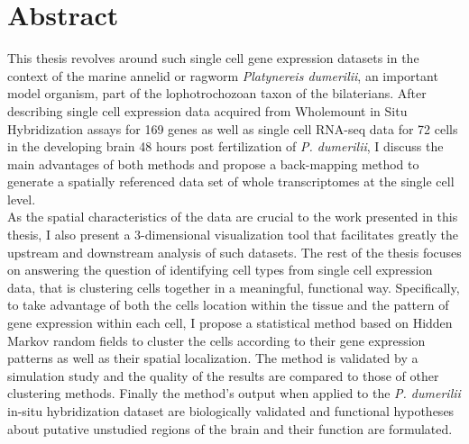 \begingroup
\let\clearpage\relax
\let\cleardoublepage\relax
\let\cleardoublepage\relax

\chapter*{Abstract}

This thesis revolves around such single cell gene expression datasets in the context of the marine annelid or ragworm \emph{Platynereis dumerilii}, an important model organism, part of the lophotrochozoan taxon of the bilaterians. After describing single cell expression data acquired from Wholemount in Situ Hybridization assays for 169 genes as well as single cell RNA-seq data for 72 cells in the developing brain 48 hours post fertilization of \emph{P. dumerilii}, I discuss the main advantages of both methods and propose a back-mapping method to generate a spatially referenced data set of whole transcriptomes at the single cell level.\\

As the spatial characteristics of the data are crucial to the work presented in this thesis, I also present a 3-dimensional visualization tool that facilitates greatly the upstream and downstream analysis of such datasets. The rest of the thesis focuses on answering the question of identifying cell types from single cell expression data, that is clustering cells together in a meaningful, functional way. Specifically, to take advantage of both the cells location within the tissue and the pattern of gene expression within each cell, I propose a statistical method based on Hidden Markov random fields to cluster the cells according to their gene expression patterns as well as their spatial localization. The method is validated by a simulation study and the quality of the results are compared to those of other clustering methods. Finally the method's output when applied to the \emph{P. dumerilii} in-situ hybridization dataset are biologically validated and functional hypotheses about putative unstudied regions of the brain and their function are formulated.



\vfill



\endgroup			

\vfill